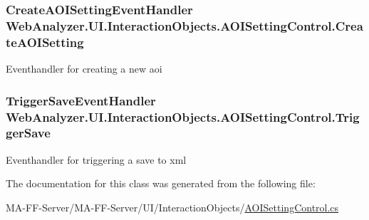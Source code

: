 \subsubsection[{Create\+A\+O\+I\+Setting}]{\setlength{\rightskip}{0pt plus 5cm}Create\+A\+O\+I\+Setting\+Event\+Handler Web\+Analyzer.\+U\+I.\+Interaction\+Objects.\+A\+O\+I\+Setting\+Control.\+Create\+A\+O\+I\+Setting}\label{class_web_analyzer_1_1_u_i_1_1_interaction_objects_1_1_a_o_i_setting_control_a655f9d463578bed0ae1ce3243eee82c0}


Eventhandler for creating a new aoi 

\hypertarget{class_web_analyzer_1_1_u_i_1_1_interaction_objects_1_1_a_o_i_setting_control_a752fb801d539bc3df62f41bb854074e2}{}
\subsubsection[{Trigger\+Save}]{\setlength{\rightskip}{0pt plus 5cm}Trigger\+Save\+Event\+Handler Web\+Analyzer.\+U\+I.\+Interaction\+Objects.\+A\+O\+I\+Setting\+Control.\+Trigger\+Save}\label{class_web_analyzer_1_1_u_i_1_1_interaction_objects_1_1_a_o_i_setting_control_a752fb801d539bc3df62f41bb854074e2}


Eventhandler for triggering a save to xml 



The documentation for this class was generated from the following file\+:\begin{DoxyCompactItemize}
\item 
M\+A-\/\+F\+F-\/\+Server/\+M\+A-\/\+F\+F-\/\+Server/\+U\+I/\+Interaction\+Objects/\hyperlink{_a_o_i_setting_control_8cs}{A\+O\+I\+Setting\+Control.\+cs}\end{DoxyCompactItemize}
